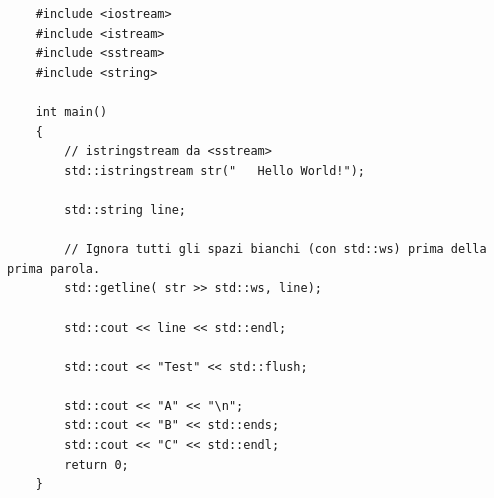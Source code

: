 \begin{lstlisting}
	#include <iostream>
	#include <istream>
	#include <sstream>
	#include <string>
	
	int main()
	{
		// istringstream da <sstream>
		std::istringstream str("   Hello World!");
		
		std::string line;
		
		// Ignora tutti gli spazi bianchi (con std::ws) prima della prima parola.
		std::getline( str >> std::ws, line);
		
		std::cout << line << std::endl;
		
		std::cout << "Test" << std::flush;
		
		std::cout << "A" << "\n";
		std::cout << "B" << std::ends;
		std::cout << "C" << std::endl;
		return 0;
	}
\end{lstlisting}

